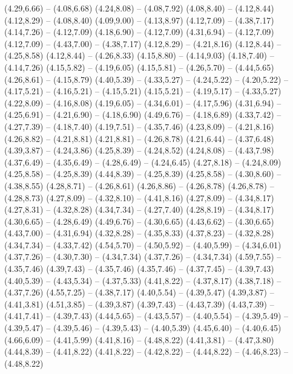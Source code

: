 {  (4.29,6.66) -- (4.08,6.68)
  (4.24,8.08) -- (4.08,7.92)
  (4.08,8.40) -- (4.12,8.44)
  (4.12,8.29) -- (4.08,8.40)
  (4.09,9.00) -- (4.13,8.97)
  (4.12,7.09) -- (4.38,7.17)
  (4.14,7.26) -- (4.12,7.09)
  (4.18,6.90) -- (4.12,7.09)
  (4.31,6.94) -- (4.12,7.09)
  (4.12,7.09) -- (4.43,7.00) -- (4.38,7.17)
  (4.12,8.29) -- (4.21,8.16)
  (4.12,8.44) -- (4.25,8.58)
  (4.12,8.44) -- (4.26,8.33)
  (4.15,8.80) -- (4.14,9.03)
  (4.18,7.40) -- (4.14,7.26)
  (4.15,5.82) -- (4.19,6.05)
  (4.15,5.81) -- (4.26,5.70) -- (4.44,5.65)
  (4.26,8.61) -- (4.15,8.79)
  (4.40,5.39) -- (4.33,5.27) -- (4.24,5.22) -- (4.20,5.22) -- (4.17,5.21) -- (4.16,5.21) -- (4.15,5.21)
  (4.15,5.21) -- (4.19,5.17) -- (4.33,5.27)
  (4.22,8.09) -- (4.16,8.08)
  (4.19,6.05) -- (4.34,6.01) -- (4.17,5.96)
  (4.31,6.94) -- (4.25,6.91) -- (4.21,6.90) -- (4.18,6.90)
  (4.49,6.76) -- (4.18,6.89)
  (4.33,7.42) -- (4.27,7.39) -- (4.18,7.40)
  (4.19,7.51) -- (4.35,7.46)
  (4.23,8.09) -- (4.21,8.16)
  (4.26,8.82) -- (4.21,8.81)
  (4.21,8.81) -- (4.26,8.78)
  (4.21,6.44) -- (4.37,6.48)
  (4.39,3.87) -- (4.24,3.86)
  (4.25,8.39) -- (4.24,8.52)
  (4.24,8.08) -- (4.43,7.98)
  (4.37,6.49) -- (4.35,6.49) -- (4.28,6.49) -- (4.24,6.45)
  (4.27,8.18) -- (4.24,8.09)
  (4.25,8.58) -- (4.25,8.39)
  (4.44,8.39) -- (4.25,8.39)
  (4.25,8.58) -- (4.30,8.60) -- (4.38,8.55)
  (4.28,8.71) -- (4.26,8.61)
  (4.26,8.86) -- (4.26,8.78)
  (4.26,8.78) -- (4.28,8.73)
  (4.27,8.09) -- (4.32,8.10) -- (4.41,8.16)
  (4.27,8.09) -- (4.34,8.17)
  (4.27,8.31) -- (4.32,8.28)
  (4.34,7.34) -- (4.27,7.40)
  (4.28,8.19) -- (4.34,8.17)
  (4.30,6.65) -- (4.28,6.49)
  (4.49,6.76) -- (4.30,6.65)
  (4.43,6.62) -- (4.30,6.65)
  (4.43,7.00) -- (4.31,6.94)
  (4.32,8.28) -- (4.35,8.33)
  (4.37,8.23) -- (4.32,8.28)
  (4.34,7.34) -- (4.33,7.42)
  (4.54,5.70) -- (4.50,5.92) -- (4.40,5.99) -- (4.34,6.01)
  (4.37,7.26) -- (4.30,7.30) -- (4.34,7.34)
  (4.37,7.26) -- (4.34,7.34)
  (4.59,7.55) -- (4.35,7.46)
  (4.39,7.43) -- (4.35,7.46)
  (4.35,7.46) -- (4.37,7.45) -- (4.39,7.43)
  (4.40,5.39) -- (4.43,5.34) -- (4.37,5.33)
  (4.41,8.22) -- (4.37,8.17)
  (4.38,7.18) -- (4.37,7.26)
  (4.55,7.25) -- (4.38,7.17)
  (4.40,5.54) -- (4.39,5.47)
  (4.39,3.87) -- (4.41,3.81)
  (4.51,3.85) -- (4.39,3.87)
  (4.39,7.43) -- (4.43,7.39)
  (4.43,7.39) -- (4.41,7.41) -- (4.39,7.43)
  (4.44,5.65) -- (4.43,5.57) -- (4.40,5.54) -- (4.39,5.49) -- (4.39,5.47) -- (4.39,5.46) -- (4.39,5.43) -- (4.40,5.39)
  (4.45,6.40) -- (4.40,6.45)
  (4.66,6.09) -- (4.41,5.99)
  (4.41,8.16) -- (4.48,8.22)
  (4.41,3.81) -- (4.47,3.80)
  (4.44,8.39) -- (4.41,8.22)
  (4.41,8.22) -- (4.42,8.22) -- (4.44,8.22) -- (4.46,8.23) -- (4.48,8.22)
}

